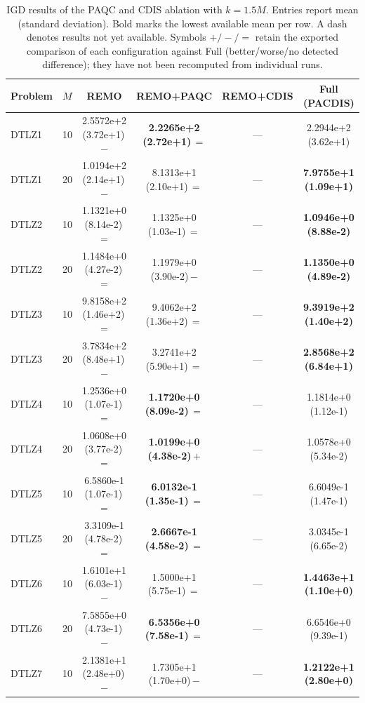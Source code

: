 \begin{table}[p]
\centering
\caption{IGD results of the PAQC and CDIS ablation with $k=1.5M$. Entries report mean (standard deviation). Bold marks the lowest available mean per row. A dash denotes results not yet available. Symbols $+/-/=$ retain the exported comparison of each configuration against Full (better/worse/no detected difference); they have not been recomputed from individual runs.}
\label{tab:exp:ablation}
\footnotesize
\setlength{\tabcolsep}{5pt}
\renewcommand{\arraystretch}{1.12}
\begin{tabular}{lc cccc}
\toprule
Problem & $M$ & REMO & REMO+PAQC & REMO+CDIS & Full (PACDIS) \\
\midrule
DTLZ1 & 10 & 2.5572e+2 (3.72e+1)\,$-$ & \textbf{2.2265e+2 (2.72e+1)}\,$=$ & --- & 2.2944e+2 (3.62e+1) \\
DTLZ1 & 20 & 1.0194e+2 (2.14e+1)\,$-$ & 8.1313e+1 (2.10e+1)\,$=$ & --- & \textbf{7.9755e+1 (1.09e+1)} \\
\addlinespace[2pt]
DTLZ2 & 10 & 1.1321e+0 (8.14e-2)\,$=$ & 1.1325e+0 (1.03e-1)\,$=$ & --- & \textbf{1.0946e+0 (8.88e-2)} \\
DTLZ2 & 20 & 1.1484e+0 (4.27e-2)\,$=$ & 1.1979e+0 (3.90e-2)\,$-$ & --- & \textbf{1.1350e+0 (4.89e-2)} \\
\addlinespace[2pt]
DTLZ3 & 10 & 9.8158e+2 (1.46e+2)\,$=$ & 9.4062e+2 (1.36e+2)\,$=$ & --- & \textbf{9.3919e+2 (1.40e+2)} \\
DTLZ3 & 20 & 3.7834e+2 (8.48e+1)\,$-$ & 3.2741e+2 (5.90e+1)\,$=$ & --- & \textbf{2.8568e+2 (6.84e+1)} \\
\addlinespace[2pt]
DTLZ4 & 10 & 1.2536e+0 (1.07e-1)\,$=$ & \textbf{1.1720e+0 (8.09e-2)}\,$=$ & --- & 1.1814e+0 (1.12e-1) \\
DTLZ4 & 20 & 1.0608e+0 (3.77e-2)\,$=$ & \textbf{1.0199e+0 (4.38e-2)}\,$+$ & --- & 1.0578e+0 (5.34e-2) \\
\addlinespace[2pt]
DTLZ5 & 10 & 6.5860e-1 (1.07e-1)\,$=$ & \textbf{6.0132e-1 (1.35e-1)}\,$=$ & --- & 6.6049e-1 (1.47e-1) \\
DTLZ5 & 20 & 3.3109e-1 (4.78e-2)\,$=$ & \textbf{2.6667e-1 (4.58e-2)}\,$=$ & --- & 3.0345e-1 (6.65e-2) \\
\addlinespace[2pt]
DTLZ6 & 10 & 1.6101e+1 (6.03e-1)\,$-$ & 1.5000e+1 (5.75e-1)\,$=$ & --- & \textbf{1.4463e+1 (1.10e+0)} \\
DTLZ6 & 20 & 7.5855e+0 (4.73e-1)\,$-$ & \textbf{6.5356e+0 (7.58e-1)}\,$=$ & --- & 6.6546e+0 (9.39e-1) \\
\addlinespace[2pt]
DTLZ7 & 10 & 2.1381e+1 (2.48e+0)\,$-$ & 1.7305e+1 (1.70e+0)\,$-$ & --- & \textbf{1.2122e+1 (2.80e+0)} \\

\end{tabular}
\end{table}
